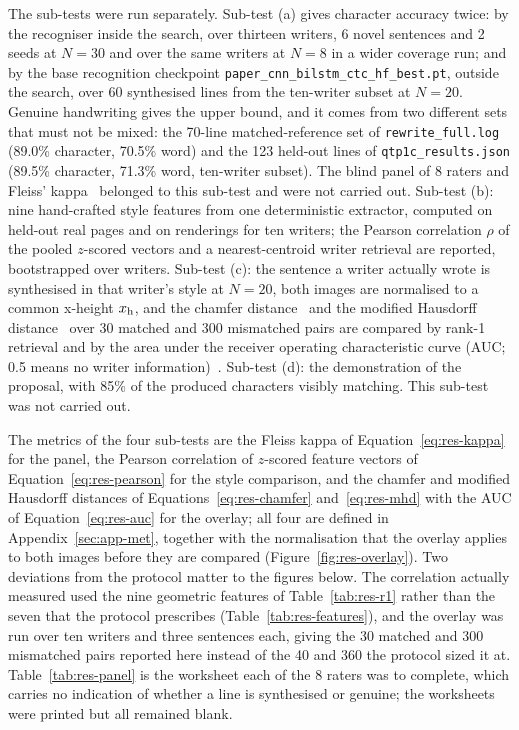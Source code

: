 
            The sub-tests were run separately.
            Sub-test (a) gives character accuracy twice: by the recogniser inside the search, over thirteen writers, 6 novel sentences and 2 seeds at $N=30$ and over the same writers at $N=8$ in a wider coverage run; and by the base recognition checkpoint \texttt{paper\_cnn\_bilstm\_ctc\_hf\_best.pt}, outside the search, over 60 synthesised lines from the ten-writer subset at $N=20$. Genuine handwriting gives the upper bound, and it comes from two different sets that must not be mixed: the 70-line matched-reference set of \texttt{rewrite\_full.log} (89.0\% character, 70.5\% word) and the 123 held-out lines of \texttt{qtp1c\_results.json} (89.5\% character, 71.3\% word, ten-writer subset). The blind panel of 8 raters and Fleiss' kappa~\cite{fleiss1971} belonged to this sub-test and were not carried out.
            Sub-test (b): nine hand-crafted style features from one deterministic extractor, computed on held-out real pages and on renderings for ten writers; the Pearson correlation $\rho$ of the pooled $z$-scored vectors and a nearest-centroid writer retrieval are reported, bootstrapped over writers.
            Sub-test (c): the sentence a writer actually wrote is synthesised in that writer's style at $N=20$, both images are normalised to a common x-height $x_{\mathrm{h}}$, and the chamfer distance~\cite{barrow1977} and the modified Hausdorff distance~\cite{dubuisson1994} over 30 matched and 300 mismatched pairs are compared by rank-1 retrieval and by the area under the receiver operating characteristic curve (AUC; 0.5 means no writer information)~\cite[p.~868]{fawcett2006}.
            Sub-test (d): the demonstration of the proposal, with 85\% of the produced characters visibly matching. This sub-test was not carried out.

            The metrics of the four sub-tests are the Fleiss kappa of Equation~\ref{eq:res-kappa} for the panel, the Pearson correlation of $z$-scored feature vectors of Equation~\ref{eq:res-pearson} for the style comparison, and the chamfer and modified Hausdorff distances of Equations~\ref{eq:res-chamfer} and~\ref{eq:res-mhd} with the AUC of Equation~\ref{eq:res-auc} for the overlay; all four are defined in Appendix~\ref{sec:app-met}, together with the normalisation that the overlay applies to both images before they are compared (Figure~\ref{fig:res-overlay}).
            Two deviations from the protocol matter to the figures below.
            The correlation actually measured used the nine geometric features of Table~\ref{tab:res-r1} rather than the seven that the protocol prescribes (Table~\ref{tab:res-features}), and the overlay was run over ten writers and three sentences each, giving the 30 matched and 300 mismatched pairs reported here instead of the 40 and 360 the protocol sized it at.
            Table~\ref{tab:res-panel} is the worksheet each of the 8 raters was to complete, which carries no indication of whether a line is synthesised or genuine; the worksheets were printed but all remained blank.

